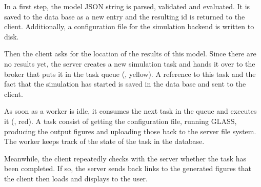 
In a first step, the model JSON string is parsed, validated and evaluated.
It is saved to the data base as a new entry and the resulting id is returned to the client.
Additionally, a configuration file for the simulation backend is written to disk. 

Then the client asks for the location of the results of this model.
Since there are no results yet, the server creates a new simulation task and hands it over to the broker that puts it in the task queue (, yellow).
A reference to this task and the fact that the simulation has started is saved in the data base and sent to the client.

As soon as a worker is idle, it consumes the next task in the queue and executes it (, red).
A task consist of getting the configuration file, running GLASS, producing the output figures and uploading those back to the server file system.
The worker keeps track of the state of the task in the database.

Meanwhile, the client repeatedly checks with the server whether the task has been completed.
If so, the server sends back links to the generated figures that the client then loads and displays to the user.







